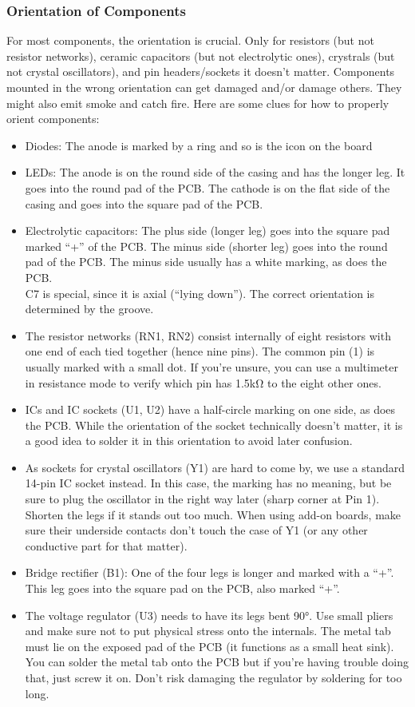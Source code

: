 \documentclass{article}
\begin{document}
\subsubsection{Orientation of Components}
For most components, the orientation is crucial. Only for resistors (but not resistor networks), ceramic capacitors (but not electrolytic ones), crystrals (but not crystal oscillators), and pin headers/sockets it doesn't matter. Components mounted in the wrong orientation can get damaged and/or damage others. They might also emit smoke and catch fire. Here are some clues for how to properly orient components:

\begin{itemize}
\item Diodes: The anode is marked by a ring and so is the icon on the board
\item LEDs: The anode is on the round side of the casing and has the longer leg. It goes into the round pad of the PCB. The cathode is on the flat side of the casing and goes into the square pad of the PCB. 
\item Electrolytic capacitors: The plus side (longer leg) goes into the square pad marked ``+'' of the PCB. The minus side (shorter leg) goes into the round pad of the PCB. The minus side usually has a white marking, as does the PCB. \\
C7 is special, since it is axial (``lying down''). The correct orientation is determined by the groove. 
\item The resistor networks (RN1, RN2) consist internally of eight resistors with one end of each tied together (hence nine pins). The common pin (1) is usually marked with a small dot. If you're unsure, you can use a multimeter in resistance mode to verify which pin has 1.5kΩ to the eight other ones. 
\item ICs and IC sockets (U1, U2) have a half-circle marking on one side, as does the PCB. While the orientation of the socket technically doesn't matter, it is a good idea to solder it in this orientation to avoid later confusion. 
\item As sockets for crystal oscillators (Y1) are hard to come by, we use a standard 14-pin IC socket instead. In this case, the marking has no meaning, but be sure to plug the oscillator in the right way later (sharp corner at Pin 1). \\
Shorten the legs if it stands out too much. When using add-on boards, make sure their underside contacts don't touch the case of Y1 (or any other conductive part for that matter). 
\item Bridge rectifier (B1): One of the four legs is longer and marked with a ``+''. This leg goes into the square pad on the PCB, also marked ``+''. 
\item The voltage regulator (U3) needs to have its legs bent 90°. Use small pliers and make sure not to put physical stress onto the internals. The metal tab must lie on the exposed pad of the PCB (it functions as a small heat sink). You can solder the metal tab onto the PCB but if you're having trouble doing that, just screw it on. Don't risk damaging the regulator by soldering for too long. 
\end{itemize}
\end{document}
